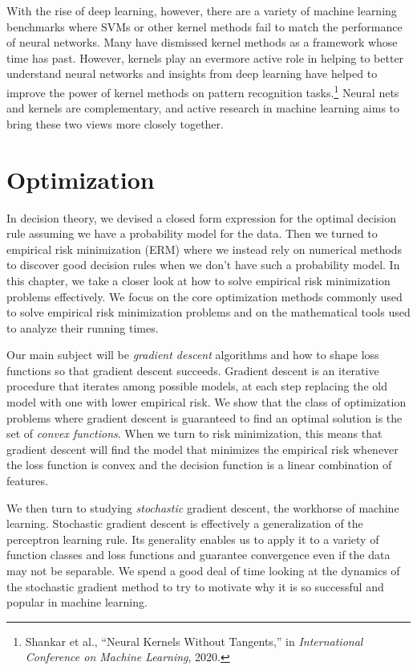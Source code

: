 \documentclass{tufte-book}
\begin{document}
With the rise of deep learning, however, there are a variety of machine
learning benchmarks where SVMs or other kernel methods fail to match the
performance of neural networks. Many have dismissed kernel methods as a
framework whose time has past. However, kernels play an evermore active
role in helping to better understand neural networks and insights from
deep learning have helped to improve the power of kernel methods on
pattern recognition tasks.\footnote{Shankar et al., {``Neural Kernels
  Without Tangents,''} in \emph{International Conference on Machine
  Learning}, 2020.} Neural nets and kernels are complementary, and
active research in machine learning aims to bring these two views more
closely together.

\chapter{Optimization}

In decision theory, we devised a closed form expression for the optimal
decision rule assuming we have a probability model for the data. Then we
turned to empirical risk minimization (ERM) where we instead rely on
numerical methods to discover good decision rules when we don't have
such a probability model. In this chapter, we take a closer look at how
to solve empirical risk minimization problems effectively. We focus on
the core optimization methods commonly used to solve empirical risk
minimization problems and on the mathematical tools used to analyze
their running times.

Our main subject will be \emph{gradient descent} algorithms and how to
shape loss functions so that gradient descent succeeds. Gradient descent
is an iterative procedure that iterates among possible models, at each
step replacing the old model with one with lower empirical risk. We show
that the class of optimization problems where gradient descent is
guaranteed to find an optimal solution is the set of \emph{convex
functions}. When we turn to risk minimization, this means that gradient
descent will find the model that minimizes the empirical risk whenever
the loss function is convex and the decision function is a linear
combination of features.

We then turn to studying \emph{stochastic} gradient descent, the
workhorse of machine learning. Stochastic gradient descent is
effectively a generalization of the perceptron learning rule. Its
generality enables us to apply it to a variety of function classes and
loss functions and guarantee convergence even if the data may not be
separable. We spend a good deal of time looking at the dynamics of the
stochastic gradient method to try to motivate why it is so successful
and popular in machine learning.
\end{document}
